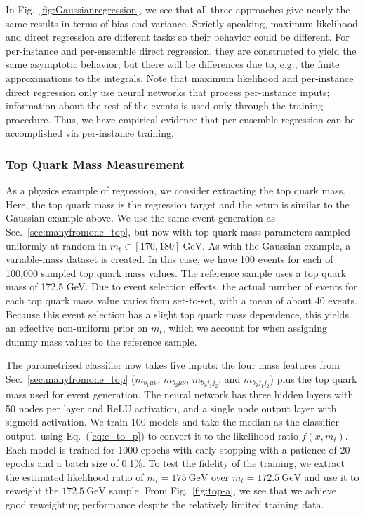 \documentclass[aps,prx,reprint,preprintnumbers,superscriptaddress,nofootinbib,longbibliography,floatfix]{revtex4-2}
\DeclareRobustCommand{\Sec}[1]{Sec.~\ref{sec:#1}}
\DeclareRobustCommand{\Fig}[1]{Fig.~\ref{fig:#1}}
\DeclareRobustCommand{\Eq}[1]{Eq.~(\ref{eq:#1})}
\begin{document}
In \Fig{Gaussianregression}, we see that all three approaches give nearly the same results in terms of bias and variance.
%
Strictly speaking, maximum likelihood and direct regression are different tasks so their behavior could be different.
%
For per-instance and per-ensemble direct regression, they are constructed to yield the same asymptotic behavior, but there will be differences due to, e.g., the finite approximations to the integrals.
%
Note that maximum likelihood and per-instance direct regression only use neural networks that process per-instance inputs; information about the rest of the events is used only through the training procedure.
%
Thus, we have empirical evidence that per-ensemble regression can be accomplished via per-instance training.


\subsubsection{Top Quark Mass Measurement}
\label{sec:top_mass_regression}

As a physics example of regression, we consider extracting the top quark mass.
%
Here, the top quark mass is the regression target and the setup is similar to the Gaussian example above.
%
We use the same event generation as \Sec{manyfromone_top}, but now with top quark mass parameters sampled uniformly at random in $m_t \in [170,180]~\text{GeV}$.
%
As with the Gaussian example, a variable-mass dataset is created.  In this case, we have 100 events for each of 100,000 sampled top quark mass values. 
%
The reference sample uses a top quark mass of 172.5 GeV.
%
Due to event selection effects, the actual number of events for each top quark mass value varies from set-to-set, with a mean of about 40 events.
%
Because this event selection has a slight top quark mass dependence, this yields an effective non-uniform prior on $m_t$, which we account for when assigning dummy mass values to the reference sample.


The parametrized classifier now takes five inputs: the four mass features from \Sec{manyfromone_top} ($m_{b_1\mu\nu}$, $m_{b_2\mu\nu}$, $m_{b_1j_1j_2}$, and $m_{b_2j_1j_2}$) plus the top quark mass used for event generation.
%
The neural network has three hidden layers with 50 nodes per layer and ReLU activation, and a single node output layer with sigmoid activation.
%
We train 100 models and take the median as the classifier output, using \Eq{c_to_p} to convert it to the likelihood ratio $f(x,m_t)$.
%
Each model is trained for 1000 epochs with early stopping with a patience of 20 epochs and a batch size of 0.1\%.
%
To test the fidelity of the training, we extract the estimated likelihood ratio of $m_t = 175~\text{GeV}$ over $m_t = 172.5~\text{GeV}$ and use it to reweight the $172.5~\text{GeV}$ sample.
%
From \Fig{top-a}, we see that we achieve good reweighting performance despite the relatively limited training data.
\end{document}
